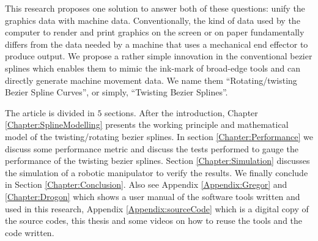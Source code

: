 {    This research proposes one solution to answer both of these questions: unify the graphics data with machine data. Conventionally, the kind of data used by the computer to render and print graphics on the screen or on paper fundamentally differs from the data needed by a machine that uses a mechanical end effector to produce output. We propose a rather simple innovation in the conventional bezier splines which enables them to mimic the ink-mark of broad-edge tools and can directly generate machine movement data. We name them ``Rotating/twisting Bezier Spline Curves'', or simply, ``Twisting Bezier Splines''. 

    The article is divided in $5$ sections. After the introduction, Chapter \ref{Chapter:SplineModelling} presents the working principle and mathematical model of the twisting/rotating bezier splines. In section \ref{Chapter:Performance} we discuss some performance metric and discuss the tests performed to gauge the performance of the twisting bezier splines. Section \ref{Chapter:Simulation} discusses the simulation of a robotic manipulator to verify the results. We finally conclude in Section \ref{Chapter:Conclusion}. Also see Appendix \ref{Appendix:Gregor} and \ref{Chapter:Drogon} which shows a user manual of the software tools written and used in this research, Appendix \ref{Appendix:sourceCode} which is a digital copy of the source codes, this thesis and some videos on how to reuse the tools and the code written.
} 
